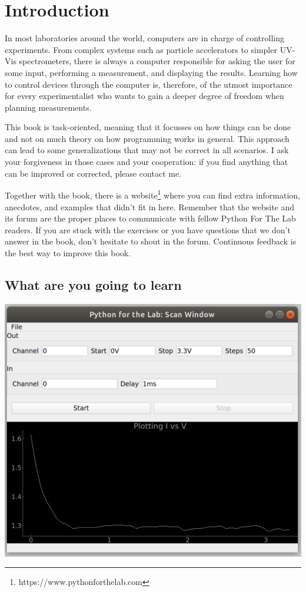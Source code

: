 \chapter{Introduction}\label{ch:introduction}
In most laboratories around the world, computers are in charge of controlling experiments. From complex systems such as particle accelerators to simpler UV-Vis spectrometers, there is always a computer responsible for asking the user for some input, performing a measurement, and displaying the results. Learning how to control devices through the computer is, therefore, of the utmost importance for every experimentalist who wants to gain a deeper degree of freedom when planning measurements.

This book is task-oriented, meaning that it focusses on how things can be done and not on much theory on how programming works in general. This approach can lead to some generalizations that may not be correct in all scenarios. I ask your forgiveness in those cases and your cooperation: if you find anything that can be improved or corrected, please contact me.

Together with the book, there is a website\footnote{https://www.pythonforthelab.com} where you can find extra information, anecdotes, and examples that didn't fit in here. Remember that the website and its forum are the proper places to communicate with fellow Python For The Lab readers. If you are stuck with the exercises or you have questions that we don't answer in the book, don't hesitate to shout in the forum. Continuous feedback is the best way to improve this book.

\section{What are you going to learn}\label{sec:what-are-you-going-to-learn}
\begin{center}
\includegraphics[width=.6\linewidth]{images/Chapter_01/screenshot.png}
\end{center}

